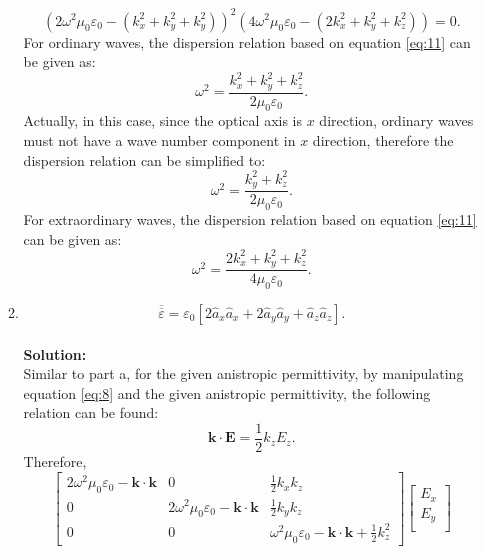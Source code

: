 \documentclass[11pt]{amsart}
\begin{document}
\begin{enumerate}
\begin{enumerate}
\begin{equation}
\label{eq:11}
(2\omega^2 \mu_0 \varepsilon_{0}-(k_{x}^2+k_{y}^2+k_{y}^2))^2(4 \omega^2 \mu_{0} \varepsilon_{0} -(2k_{x}^2+k_{y}^2+k_{z}^2))=0.
\end{equation}
For ordinary waves, the dispersion relation based on equation \ref{eq:11} can be given as:
\begin{equation}
\label{eq:12}
\omega^2=\frac{k_{x}^2+k_{y}^2+k_{z}^2}{2 \mu_0 \varepsilon_{0}}.
\end{equation}
Actually, in this case, since the optical axis is $x$ direction, ordinary waves must not have a wave number component in $x$ direction, therefore the dispersion relation can be simplified to:
\begin{equation}
\omega^2=\frac{k_{y}^2+k_{z}^2}{2 \mu_0 \varepsilon_{0}}.
\end{equation}
For extraordinary waves, the dispersion relation based on equation \ref{eq:11} can be given as:
\begin{equation}
\label{eq:13}
\omega^2=\frac{2 k_{x}^2+k_{y}^2+k_{z}^2}{4 \mu_0 \varepsilon_{0}}.
\end{equation}
\item 
\begin{equation*}
\overline{\overline{\varepsilon}}=\varepsilon_0 \left [ 2\hat{a}_x \hat{a}_x +2\hat{a}_y \hat{a}_y +\hat{a}_z \hat{a}_z \right ]. 
\end{equation*}
\\
\textbf{Solution:}\\
Similar to part a, for the given anistropic permittivity, by manipulating equation \ref{eq:8} and the given anistropic permittivity, the following relation can be found:
\begin{equation}
\mathbf{k}\cdot \mathbf{E}=\frac{1}{2}k_z E_z.
\end{equation}
Therefore,
\begin{equation}
\label{eq:14}
\begin{bmatrix}
 2 \omega^2 \mu_0 \varepsilon_{0}-\mathbf{k} \cdot \mathbf{k} & 0 & \frac{1}{2}k_{x}k_{z}\\ 
0 & 2\omega^2 \mu_0 \varepsilon_{0}-\mathbf{k} \cdot \mathbf{k} & \frac{1}{2}k_{y}k_{z} \\ 
0 & 0 & \omega^2 \mu_0 \varepsilon_{0}-\mathbf{k} \cdot \mathbf{k}+\frac{1}{2}k_{z}^2
\end{bmatrix}
\begin{bmatrix}
E_x\\ 
E_y\\ 

\end{bmatrix}
\end{equation}
\end{enumerate}
\end{enumerate}
\end{document}

